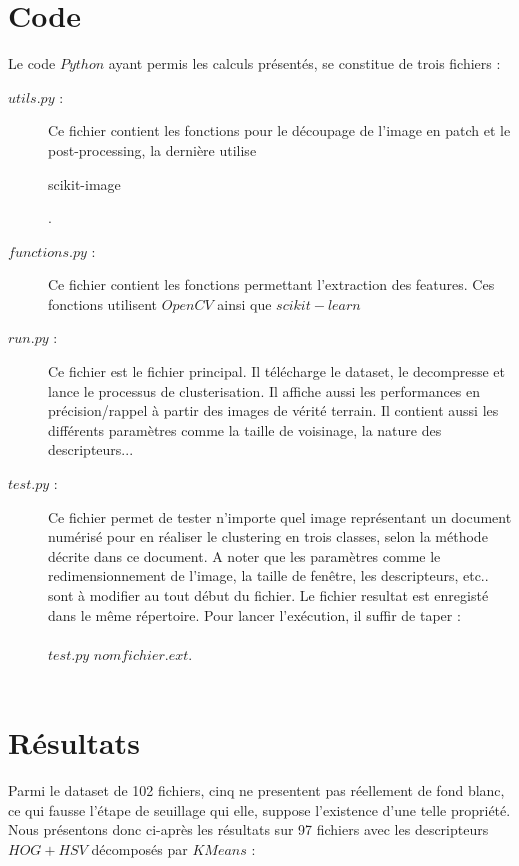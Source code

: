 \documentclass{book}
\begin{document}
\chapter{Code}

Le code $Python$ ayant permis les calculs présentés, se constitue de trois fichiers :
\begin{description} %

\item[$utils.py$ :] Ce fichier contient les fonctions pour le découpage de l'image en patch et le post-processing, la dernière utilise
\begin{itshape}scikit-image\end{itshape} \cite{scikit-image}.
\item[$functions.py$ :] Ce fichier contient les fonctions permettant l'extraction des features. Ces fonctions utilisent $OpenCV$ \cite{opencv_library} ainsi que $scikit-learn$ \cite{scikit-learn}
\item[$run.py$ :] Ce fichier est le fichier principal. Il télécharge le dataset, le decompresse et lance le processus de clusterisation. Il affiche aussi les performances
en précision/rappel à partir des images de vérité terrain. Il contient aussi les différents paramètres comme la taille de voisinage, la nature des descripteurs...
\item[$test.py$ :] Ce fichier permet de tester n'importe quel image représentant un document numérisé pour en réaliser le clustering 
en trois classes, selon la méthode décrite dans ce document. A noter que les paramètres comme le redimensionnement de l'image, la taille
de fenêtre, les descripteurs, etc.. sont à modifier au tout début du fichier. 
Le fichier resultat est enregisté dans le même répertoire. Pour lancer
l'exécution, il suffir de taper :\\
\\
                    $test.py$ $nomfichier.ext$.\\
\\


\end{description}


\chapter{Résultats}

Parmi le dataset de 102 fichiers, cinq ne presentent pas réellement de fond blanc, ce qui fausse l'étape de seuillage qui elle, 
suppose l'existence d'une telle propriété.\\
Nous présentons donc ci-après les résultats sur 97 fichiers avec les descripteurs $HOG+HSV$ décomposés par $KMeans$ :\\
\end{document}
